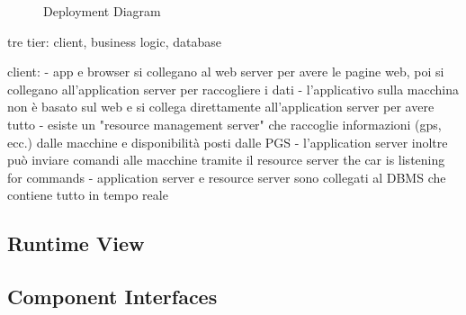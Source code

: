 \documentclass[english]{article}
\begin{document}
\begin{figure}[H]
	\centering
	\caption{Deployment Diagram}
	\label{deploymentdiagram}
\end{figure}

tre tier: client, business logic, database

client:
- app e browser si collegano al web server per avere le pagine web, poi si collegano all'application server per raccogliere i dati
- l'applicativo sulla macchina non è basato sul web e si collega direttamente all'application server per avere tutto
- esiste un "resource management server" che raccoglie informazioni (gps, ecc.) dalle macchine e disponibilità posti dalle PGS
- l'application server inoltre può inviare comandi alle macchine tramite il resource server
the car is listening for commands
- application server e resource server sono collegati al DBMS che contiene tutto in tempo reale

\subsection{Runtime View}


\subsection{Component Interfaces}
\end{document}

